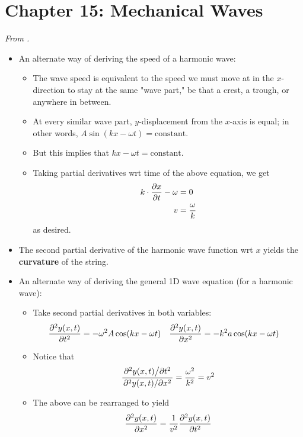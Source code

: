 \documentclass[../notes.tex]{subfiles}
\begin{document}
\section{Chapter 15: Mechanical Waves}
\emph{From \textcite{bib:YoungFreedman}.}
\begin{itemize}
    \item {}An alternate way of deriving the speed of a harmonic wave:
    \begin{itemize}
        \item The wave speed is equivalent to the speed we must move at in the $x$-direction to stay at the same "wave part," be that a crest, a trough, or anywhere in between.
        \item At every similar wave part, $y$-displacement from the $x$-axis is equal; in other words, $A\sin(kx-\omega t)=\text{constant}$.
        \item But this implies that $kx-\omega t=\text{constant}$.
        \item Taking partial derivatives wrt time of the above equation, we get
        \begin{align*}
            k\cdot\pdv{x}{t}-\omega &= 0\\
            v &= \frac{\omega}{k}
        \end{align*}
        as desired.
    \end{itemize}
    \item The second partial derivative of the harmonic wave function wrt $x$ yields the \textbf{curvature} of the string.
    \item An alternate way of deriving the general 1D wave equation (for a harmonic wave):
    \begin{itemize}
        \item Take second partial derivatives in both variables:
        \begin{align*}
            \pdv[2]{y(x,t)}{t} &= -\omega^2A\cos(kx-\omega t)&
            \pdv[2]{y(x,t)}{x} &= -k^2a\cos(kx-\omega t)
        \end{align*}
        \item Notice that
        \begin{equation*}
            \frac{\pdv*[2]{y(x,t)}{t}}{\pdv*[2]{y(x,t)}{x}} = \frac{\omega^2}{k^2} = v^2
        \end{equation*}
        \item The above can be rearranged to yield
        \begin{equation*}
            \pdv[2]{y(x,t)}{x} = \frac{1}{v^2}\pdv[2]{y(x,t)}{t}

\end{equation*}
\end{itemize}
\end{itemize}
\end{document}
